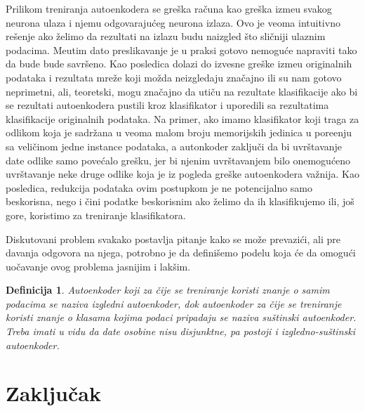 \documentclass{article}
\newtheorem{definition}{Definicija}
\let\oldsection\section
\renewcommand\section{\clearpage\oldsection}
\begin{document}
	Prilikom treniranja autoenkodera se gre\v ska ra\v cuna kao gre\v ska izme\dj u svakog neurona ulaza i njemu odgovaraju\'ceg neurona izlaza. 
	Ovo je veoma intuitivno re\v senje ako \v zelimo da rezultati na izlazu budu naizgled \v sto sli\v cniji ulaznim podacima. 
	Me\dj utim dato preslikavanje je u praksi gotovo nemogu\'ce napraviti tako da bude bude savr\v seno.
	Kao posledica dolazi do izvesne gre\v ske izme\dj u originalnih podataka i rezultata mre\v ze koji mo\v zda neizgledaju zna\v cajno ili su nam gotovo neprimetni, ali, teoretski, mogu zna\v cajno da uti\v cu na rezultate klasifikacije ako bi se rezultati autoenkodera pustili kroz klasifikator i uporedili sa rezultatima klasifikacije originalnih podataka.
	Na primer, ako imamo klasifikator koji traga za odlikom koja je sadr\v zana u veoma malom broju memorijskih jedinica u pore\dj enju sa veli\v cinom jedne instance podataka, a autonkoder zaklju\v ci da bi uvr\v stavanje date odlike samo pove\'calo gre\v sku, jer bi njenim uvr\v stavanjem bilo onemogu\'ceno uvr\v stavanje neke druge odlike koja je iz pogleda gre\v ske autoenkodera va\v znija.
	Kao posledica, redukcija podataka ovim postupkom je ne potencijalno samo beskorisna, nego i \v cini podatke beskorisnim ako \v zelimo da ih klasifikujemo ili, jo\v s gore, koristimo za treniranje klasifikatora.
	
	Diskutovani problem svakako postavlja pitanje kako se mo\v ze prevazi\'ci, ali pre davanja odgovora na njega, potrobno je da defini\v semo podelu koja \'ce da omogu\'ci uo\v cavanje ovog problema jasnijim i lak\v sim.
	
	\begin{definition}
		Autoenkoder koji za \v cije se treniranje koristi znanje o samim podacima se naziva \emph{izgledni autoenkoder}, dok autoenkoder za \v cije se treniranje koristi znanje o klasama kojima podaci pripadaju se naziva \emph{su\v stinski autoenkoder}. Treba imati u vidu da date osobine nisu disjunktne, pa postoji i \emph{izgledno-su\v stinski autoenkoder}.
	\end{definition}
	
	
	
	\section*{Zaklju\v cak}
	
	\pagebreak
	
	
\end{document}

